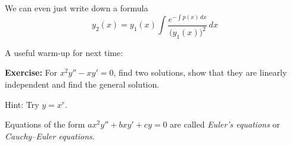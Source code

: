 \documentclass[10pt,aspectratio=169]{beamer}
\begin{document}
\begin{frame}
We can even just write down a formula
\begin{equation*}
y_2(x) = y_1(x) \int \frac{e^{-\int p(x)\,dx}}{{\bigl(y_1(x)\bigr)}^2} \,dx
\end{equation*}
\end{frame}

\begin{frame}
A useful warm-up for next time:

\medskip

\textbf{Exercise:}
For $x^2 y'' - x y' = 0$, find two solutions, show that they
are linearly independent and find the general solution.

\pause
Hint: Try $y = x^r$.

\medskip
\pause

Equations of the form $a x^2 y'' + b x y' + c y = 0$ are called
\emph{Euler's equations} or
\emph{Cauchy--Euler equations}.

\end{frame}
\end{document}
